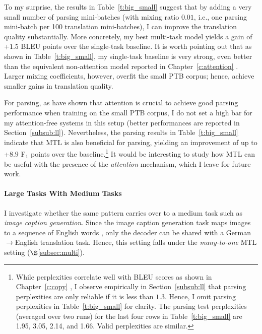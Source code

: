 To my surprise, the results in Table~\ref{t:big_small} suggest that
by adding a very small number of parsing mini-batches (with mixing ratio $0.01$,
i.e., one parsing mini-batch per 100 translation mini-batches), I can improve
the translation quality substantially. More concretely,
my best multi-task model yields a gain of +$1.5$ BLEU points over the
single-task baseline. It is worth pointing out that as shown in
Table~\ref{t:big_small}, my single-task baseline is very strong, even better
than the equivalent non-attention model reported in Chapter~\ref{c:attention} \cite{luong15attn}. Larger
mixing coefficients, however, overfit the small
PTB corpus; hence, achieve smaller gains in translation quality. 

For parsing, as \citet{vinyals15grammar} have shown that attention is crucial to
achieve good parsing performance when training on the small PTB corpus,
I do not set a high bar for my attention-free systems in this setup (better
performances are reported in Section~\ref{subsub:ll}). Nevertheless, the parsing
results in Table~\ref{t:big_small} indicate that MTL is
also beneficial for parsing, yielding an improvement of up to +$8.9$ F$_1$ points
over the baseline.\footnote{While perplexities correlate well with BLEU scores as shown
in Chapter~\ref{c:copy} \cite{luong15}, I observe empirically in Section~\ref{subsub:ll} that parsing perplexities are only
reliable if it is less than $1.3$. Hence, I omit parsing perplexities in
Table~\ref{t:big_small} for
clarity. The parsing test perplexities (averaged over two
runs) for the last four rows in Table~\ref{t:big_small} are 1.95, 3.05, 2.14, and 1.66. Valid perplexities
are similar.} 
It would be interesting to study how MTL can be
useful with the presence of the {\it attention} mechanism, which I
leave for future work.

\paragraph{Large Tasks With Medium Tasks}
I investigate whether the same pattern carries over to a medium task
such as {\it image caption generation}. Since the image caption
generation task maps images to a sequence of
English words \citep{vinyals15caption,xu15}, only the decoder can be
shared with a German$\rightarrow$English translation task. Hence, this
setting falls under the {\it many-to-one} MTL setting ($\S$\ref{subsec:multi}).

